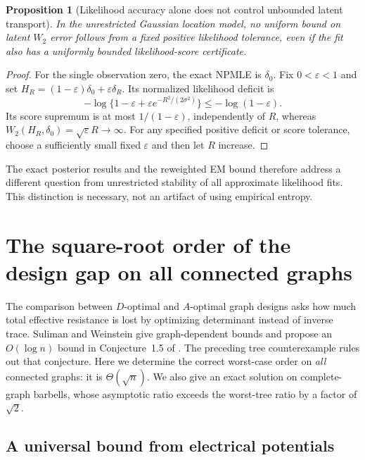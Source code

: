\documentclass[11pt,a4paper]{article}
\newtheorem{proposition}[theorem]{Proposition}
\theoremstyle{definition}
\theoremstyle{remark}
\numberwithin{equation}{section}
\begin{document}
\begin{proposition}[Likelihood accuracy alone does not control
unbounded latent transport]\label{p3:cm:approx-obstruction}
In the unrestricted Gaussian location model, no uniform bound on latent
$W_2$ error follows from a fixed positive likelihood tolerance, even
if the fit also has a uniformly bounded likelihood-score certificate.
\end{proposition}

\begin{proof}
For the single observation zero, the exact NPMLE is $\delta_0$.
Fix $0<\varepsilon<1$ and set
$H_R=(1-\varepsilon)\delta_0+\varepsilon\delta_R$.
Its normalized likelihood deficit is
\[
 -\log\{1-\varepsilon+\varepsilon e^{-R^2/(2\sigma^2)}\}
 \le-\log(1-\varepsilon).
\]
Its score supremum is at most $1/(1-\varepsilon)$, independently of
$R$, whereas $W_2(H_R,\delta_0)=\sqrt\varepsilon R\to\infty$.
For any specified positive deficit or score tolerance, choose a
sufficiently small fixed $\varepsilon$ and then let $R$ increase.
\end{proof}

The exact posterior results and the reweighted EM bound therefore
address a different question from unrestricted stability of all
approximate likelihood fits.  This distinction is necessary, not an
artifact of using empirical entropy.


\section{The square-root order of the design gap on all connected graphs}
\label{p3:sec:spectral-extension}

The comparison between $D$-optimal and $A$-optimal graph designs asks
how much total effective resistance is lost by optimizing determinant
instead of inverse trace.
Suliman and Weinstein give graph-dependent bounds and propose an
$O(\log n)$ bound in Conjecture~1.5 of
\cite{p2:SulimanWeinstein2023}.
The preceding tree counterexample rules out that conjecture.
Here we determine the correct worst-case order on \emph{all} connected
graphs: it is $\Theta(\sqrt n)$.
We also give an exact solution on complete-graph barbells, whose
asymptotic ratio exceeds the worst-tree ratio by a factor of $\sqrt2$.

\subsection{A universal bound from electrical potentials}
\end{document}
